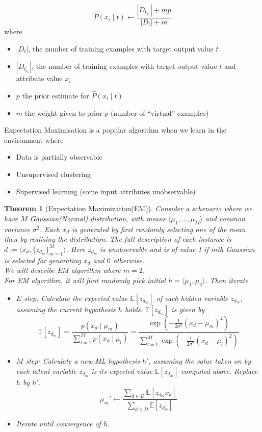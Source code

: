 \documentclass[12pt]{article}
\newtheorem{theorem}{Theorem}[section]
\theoremstyle{definition}
\begin{document}
\[
\hat{P}(x_i\mid t) \leftarrow \frac{|D_{t_{x_i}}|+mp}{|D_t|+m}
\]
where
\begin{itemize}
	\item $|D_t|$, the number of training examples with target output value $t$
	\item $|D_{t_{x_i}}|$, the number of training examples with target output value $t$ and attribute value $x_i$
	\item $p$ the prior estimate for $\hat{P}(x_i\mid t)$
	\item $m$ the weight given to prior $p$ (number of ``virtual'' examples)
\end{itemize}
Expectation Maximisation is a popular algorithm when we learn in the environment where
\begin{itemize}
	\item Data is partially observable
	\item Unsupervised clustering
	\item Supervised learning (some input attributes unobservable)
\end{itemize}
\begin{theorem}[Expectation Maximization(EM)]
\normalfont Consider a schenario where we have $M$ Gaussian(Normal) distribution, with means $\langle \mu_1, \ldots, \mu_M\rangle$ and common variance $\sigma^2$. Each $x_d$ is generated by first randomly selecting one of the mean then by realising the distribution. The full description of each instance is $d:=\langle x_d, \{z_{d_m}\}_{m=1}^M\rangle$. Here $z_{d_m}$ is unobservable and is of value 1 if $m$th Gaussian is selected for generating $x_d$ and $0$ otherwise.\\
We will describe EM algorithm where $m=2$.\\
For EM algorithm, it will first randomly pick initial $h=\langle \mu_1, \mu_2\rangle$. Then iterate
\begin{itemize}
	\item $E$ step: Calculate the expected value $\mathbb{E}[z_{d_m}]$ of each hidden variable $z_{d_m}$, assuming the current hypothesis $h$ holds. $\mathbb{E}[z_{d_m}]$ is given by
	\[
\mathbb{E}[z_{d_m}]=\frac{p(x_d\mid \mu_m)}{\sum_{l=1}^M p(x_d\mid \mu_l)} = \frac{\exp(-\frac{1}{2\sigma^2}(x_d-\mu_m)^2)}{\sum_{l=1}^M \exp(-\frac{1}{2\sigma^2}(x_d-\mu_l)^2)}
	\]
	\item $M$ step: Calculate a new ML hypothesis $h'$, assuming the value taken on by each latent variable $z_{d_m}$ is its expected value $\mathbb{E}[z_{d_m}]$ computed above. Replace $h$ by $h'$.
	\[
\mu_m'\leftarrow \frac{\sum_{d\in D}\mathbb{E}[z_{d_m}x_d]}{\sum_{d\in D}\mathbb{E}[z_{d_m}]}
	\]
	\item Iterate until convergence of $h$.
\end{itemize}
\end{theorem}
\end{document}
